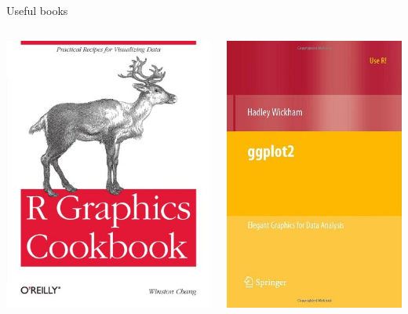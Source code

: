 \documentclass{beamer}\usepackage[]{graphicx}\usepackage[]{color}
\begin{document}
\begin{frame}{Useful books}
  \begin{columns}
    \begin{column}{0.5\textwidth}
      \includegraphics[scale=0.45]{rgraphicscookbook}
    \end{column}
  
    \begin{column}{0.5\textwidth}
      \includegraphics[scale=0.45]{ggplot2}
    \end{column}
  \end{columns}
\end{frame}
\end{document}
